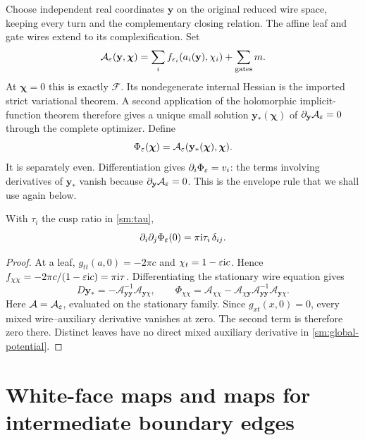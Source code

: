 Choose independent real coordinates $\mathbf y$ on the original
reduced wire space, keeping every turn and the complementary closing
relation. The affine leaf and gate wires extend to its complexification.
Set
\begin{equation}\label{sm:global-potential}
 \mathcal A_\varepsilon(\mathbf y,\boldsymbol\chi)
       =\sum_i f_{\varepsilon_i}(a_i(\mathbf y),\chi_i)+\sum_{\text{gates}}m.
\end{equation}
At $\boldsymbol\chi=0$ this is exactly $\mathcal F$. Its nondegenerate internal
Hessian is the imported strict variational theorem. A second application
of the holomorphic implicit-function theorem therefore gives a unique
small solution $\mathbf y_*(\boldsymbol\chi)$ of
$\partial_{\mathbf y}\mathcal A_\varepsilon=0$ through the complete optimizer.
Define
\begin{equation}\label{sm:Phi}
 \Phi_\varepsilon(\boldsymbol\chi)
       =\mathcal A_\varepsilon(\mathbf y_*(\boldsymbol\chi),\boldsymbol\chi).
\end{equation}
It is separately even. Differentiation gives
$\partial_i\Phi_\varepsilon=v_i$: the terms involving derivatives of
$\mathbf y_*$ vanish because $\partial_{\mathbf y}\mathcal A_\varepsilon=0$.
This is the envelope rule that we shall use again below.

\begin{lemma}\label{sm:hessian}
With $\tau_i$ the cusp ratio in \eqref{sm:tau},
\begin{equation}\label{sm:Hessian}
             \partial_i\partial_j\Phi_\varepsilon(0)
                           =\pi\mathrm i\tau_i\,\delta_{ij}.
\end{equation}
\end{lemma}
\begin{proof}
At a leaf, $g_{tt}(a,0)=-2\pi c$ and
$\chi_t=1-\varepsilon\mathrm i c$. Hence
$f_{\chi\chi}=-2\pi c/(1-\varepsilon\mathrm i c)=\pi\mathrm i\tau$.
Differentiating the stationary wire equation gives
\[
 D\mathbf y_*=-\mathcal A_{\mathbf y\mathbf y}^{-1}
                    \mathcal A_{\mathbf y\chi},\qquad
 \Phi_{\chi\chi}=
 \mathcal A_{\chi\chi}-\mathcal A_{\chi\mathbf y}
       \mathcal A_{\mathbf y\mathbf y}^{-1}\mathcal A_{\mathbf y\chi}.
\]
Here $\mathcal A=\mathcal A_\varepsilon$, evaluated on the stationary
family. Since $g_{xt}(x,0)=0$, every mixed wire--auxiliary
derivative vanishes at zero. The second term is therefore zero
there. Distinct leaves have no direct mixed auxiliary derivative
in \eqref{sm:global-potential}.
\end{proof}

\section{White-face maps and maps for intermediate boundary edges}\label{sm:maps}

